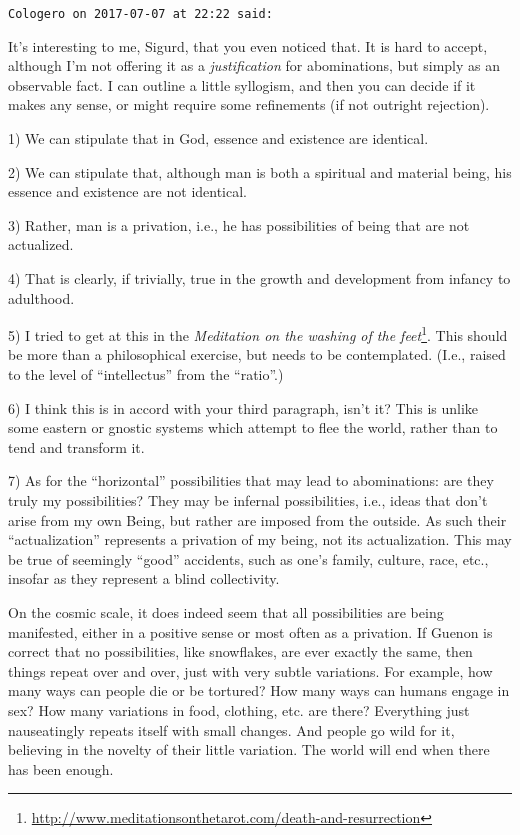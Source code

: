 \begin{footnotesize}
\begin{sffamily}
\texttt{Cologero on 2017-07-07 at 22:22 said:}

It's interesting to me, Sigurd, that you even noticed that. It is hard to accept, although I'm not offering it as a \emph{justification} for abominations, but simply as an observable fact. I can outline a little syllogism, and then you can decide if it makes any sense, or might require some refinements (if not outright rejection).

1) We can stipulate that in God, essence and existence are identical.

2) We can stipulate that, although man is both a spiritual and material being, his essence and existence are not identical.

3) Rather, man is a privation, i.e., he has possibilities of being that are not actualized.

4) That is clearly, if trivially, true in the growth and development from infancy to adulthood.

5) I tried to get at this in the \textit{Meditation on the washing of the feet}\footnote{\url{http://www.meditationsonthetarot.com/death-and-resurrection}}. This should be more than a philosophical exercise, but needs to be contemplated. (I.e., raised to the level of ``intellectus'' from the ``ratio''.)

6) I think this is in accord with your third paragraph, isn't it? This is unlike some eastern or gnostic systems which attempt to flee the world, rather than to tend and transform it.

7) As for the ``horizontal'' possibilities that may lead to abominations: are they truly my possibilities? They may be infernal possibilities, i.e., ideas that don't arise from my own Being, but rather are imposed from the outside. As such their ``actualization'' represents a privation of my being, not its actualization. This may be true of seemingly ``good'' accidents, such as one's family, culture, race, etc., insofar as they represent a blind collectivity.

On the cosmic scale, it does indeed seem that all possibilities are being manifested, either in a positive sense or most often as a privation. If Guenon is correct that no possibilities, like snowflakes, are ever exactly the same, then things repeat over and over, just with very subtle variations. For example, how many ways can people die or be tortured? How many ways can humans engage in sex? How many variations in food, clothing, etc. are there? Everything just nauseatingly repeats itself with small changes. And people go wild for it, believing in the novelty of their little variation. The world will end when there has been enough.


\end{sffamily}
\end{footnotesize}
